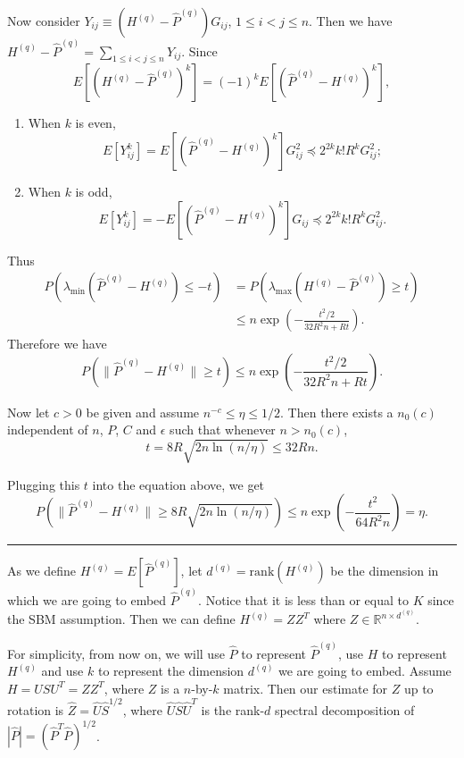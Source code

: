 \documentclass[a4paper]{article}
\newenvironment{proof}{{\bf Proof:  }}{\hfill\rule{2mm}{2mm}}
\begin{document}
\begin{proof}
Now consider $Y_{ij} \equiv \left( H^{(q)} - \hat{P}^{(q)} \right) G_{ij}$, $1 \le i < j \le n$. Then we have $H^{(q)} - \hat{P}^{(q)} = \sum_{1 \le i < j \le n} Y_{ij}$.
Since
\[
	E[(H^{(q)} - \hat{P}^{(q)})^k]
    = (-1)^k E[(\hat{P}^{(q)} - H^{(q)})^k],
\]
\begin{enumerate}
\item When $k$ is even,
\[
E[Y_{ij}^k] = E[(\hat{P}^{(q)} - H^{(q)})^k] G_{ij}^2 \preceq 2^{2k} k! R^k G_{ij}^2;
\]
\item When $k$ is odd,
\[
E[Y_{ij}^k] = - E[(\hat{P}^{(q)} - H^{(q)})^k] G_{ij} \preceq 2^{2k} k! R^k G_{ij}^2.
\]
\end{enumerate}
Thus
\begin{align*}
	P \left( \lambda_{\min}(\hat{P}^{(q)} - H^{(q)}) \le -t \right) &
    = P \left( \lambda_{\max}(H^{(q)} - \hat{P}^{(q)}) \ge t \right) \\
    & \le n \exp \left( - \frac{t^2/2}{32 R^2 n + R t} \right).
\end{align*}
Therefore we have
\[
	P \left( \| \hat{P}^{(q)} - H^{(q)} \| \ge t \right)
    \le n \exp \left( - \frac{t^2/2}{32 R^2 n + R t} \right).
\]

Now let $c > 0$ be given and assume $n^{-c} \le \eta \le 1/2$. Then there exists a $n_0(c)$ independent of $n$, $P$, $C$ and $\epsilon$ such that whenever $n > n_0(c)$,
\[
	t = 8 R \sqrt{2 n \ln(n/\eta)} \le 32 R n.
\]

Plugging this $t$ into the equation above, we get
\[
	P(\| \hat{P}^{(q)} - H^{(q)} \| \ge 8 R \sqrt{2 n \ln(n/\eta)})
    \le n \exp\left(-\frac{t^2}{64 R^2 n}\right) = \eta.
\]
\end{proof}


As we define $H^{(q)} = E[\hat{P}^{(q)}]$, let $d^{(q)} = \mathrm{rank}(H^{(q)})$ be the dimension in which we are going to embed $\hat{P}^{(q)}$. Notice that it is less than or equal to $K$ since the SBM assumption. Then we can define $H^{(q)} = Z Z^T$ where $Z \in \mathbb{R}^{n \times d^{(q)}}$.



For simplicity, from now on, we will use $\hat{P}$ to represent $\hat{P}^{(q)}$, use $H$ to represent $H^{(q)}$ and use $k$ to represent the dimension $d^{(q)}$ we are going to embed. Assume $H = U S U^T = Z Z^T$, where $Z$ is a $n$-by-$k$ matrix. Then our estimate for $Z$ up to rotation is $\hat{Z} = \hat{U} \hat{S}^{1/2}$, where $\hat{U} \hat{S} \hat{U}^T$ is the rank-$d$ spectral decomposition of $|\hat{P}| = (\hat{P}^T \hat{P})^{1/2}$.
\end{document}
